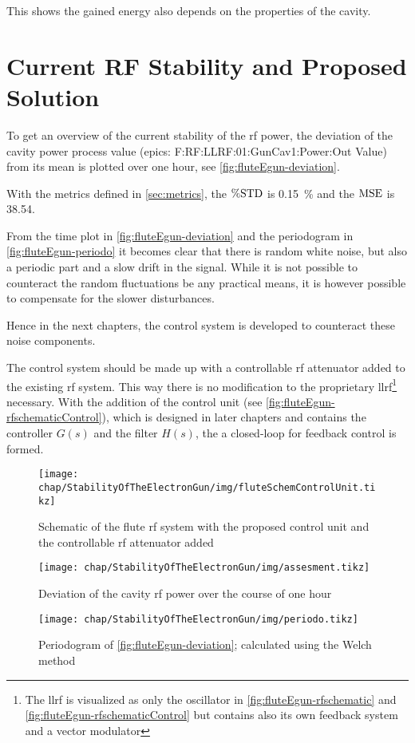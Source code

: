 This shows the gained energy also depends on the properties of the cavity.

\section{Current RF Stability and Proposed Solution}
To get an overview of the current stability of the \gls{rf} power, the deviation of the cavity power process value (\gls{epics}: F:RF:LLRF:01:GunCav1:Power:Out Value) from its mean is plotted over one hour, see \autoref{fig:fluteEgun-deviation}.


With the metrics defined in \autoref{sec:metrics}, the $\operatorname{\%STD}$ is \SI{0.15}{\percent} and the $\operatorname{MSE}$ is \num{38.54}.

From the time plot in \autoref{fig:fluteEgun-deviation} and the periodogram in \autoref{fig:fluteEgun-periodo} it becomes clear that there is random white noise, but also a periodic part and a slow drift in the signal. While it is not possible to counteract the random fluctuations be any practical means, it is however possible to compensate for the slower disturbances.

Hence in the next chapters, the control system is developed to counteract these noise components. 

The control system should be made up with a controllable \gls{rf} attenuator added to the existing \gls{rf} system. This way there is no modification to the proprietary \gls{llrf}\footnote{The \gls{llrf} is visualized as only the oscillator in \autoref{fig:fluteEgun-rfschematic} and \autoref{fig:fluteEgun-rfschematicControl} but contains also its own feedback system and a vector modulator} necessary. With the addition of the control unit (see \autoref{fig:fluteEgun-rfschematicControl}), which is designed in later chapters and contains the controller $G(s)$ and the filter $H(s)$, the a closed-loop for feedback control is formed.

\begin{figure}[tb]
	\centering
	\texttt{[image: chap/StabilityOfTheElectronGun/img/fluteSchemControlUnit.tikz]}
	\caption{Schematic of the \gls{flute} \gls{rf} system with the proposed control unit and the controllable \gls{rf} attenuator added}
	\label{fig:fluteEgun-rfschematicControl}
\end{figure}

\begin{figure}[tb]
	\centering
	\texttt{[image: chap/StabilityOfTheElectronGun/img/assesment.tikz]}
	\caption{Deviation of the cavity \gls{rf} power over the course of one hour}
	\label{fig:fluteEgun-deviation}
\end{figure}

\begin{figure}[tb]
	\centering
	\texttt{[image: chap/StabilityOfTheElectronGun/img/periodo.tikz]}
	\caption{Periodogram of \autoref{fig:fluteEgun-deviation}; calculated using the Welch method}
	\label{fig:fluteEgun-periodo}
\end{figure}




